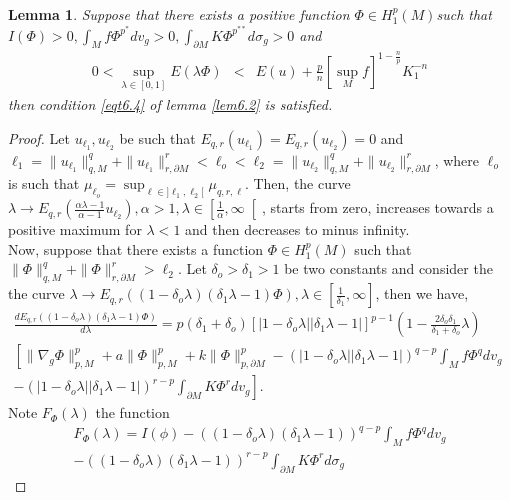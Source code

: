 \documentclass{Tran-l}
\newtheorem{lem}[thm]{Lemma}
\theoremstyle{definition}
\theoremstyle{remark}
\numberwithin{equation}{section}
\begin{document}
\begin{lem}\label{lem6.3}
Suppose that there exists a positive function $\Phi\in H^p_1(M)$such
that $I(\Phi)>0, \int_Mf\Phi^{p^*}dv_g>0, \int_{\partial
M}K\Phi^{p^{**}}d\sigma_g>0$ and
\begin{eqnarray*}
 0<\underset{\lambda\in[0,1]}\sup E(\lambda\Phi) &<&
E(u)+\frac{p}{n}\left[\sup_Mf\right]^{1-\frac{n}{p}}K_1^{-n}
\end{eqnarray*}
then  condition \eqref{eqt6.4} of lemma \ref{lem6.2} is satisfied.
\end{lem}
\begin{proof} Let  $u_{\ell_1},u_{\ell_2}$ be such that
$E_{q,r}(u_{\ell_1})=E_{q,r}(u_{\ell_2})=0$ and
$\ell_1=\|u_{\ell_1}\|^q_{q, M}+\|u_{\ell_1}\|^r_{r,\partial
M}<\ell_o<\ell_2=\|u_{\ell_2}\|^q_{q,
M}+\|u_{\ell_2}\|^r_{r,\partial M}$, where $\ell_o$ is such that
$\mu_{\ell_o}=\sup_{\ell\in]\ell_1,\ell_2[}\mu_{q,r,\ell}$. Then,
the curve $\lambda\rightarrow
E_{q,r}(\frac{\alpha\lambda-1}{\alpha-1} u_{\ell_2}), \alpha>1,
\lambda\in\left[\frac{1}{\alpha},\infty\right[$, starts from zero,
increases towards a positive maximum for $\lambda<1$ and
then decreases to minus infinity.\\
Now, suppose that there exists a function $\Phi\in H^p_1(M)$ such
that $\|\Phi\|^q_{q, M}+\|\Phi\|^r_{r,\partial M}>\ell_2$. Let
$\delta_o>\delta_1>1$ be two constants and consider the the curve
$\lambda\rightarrow E_{q,r}(
(1-\delta_o\lambda)(\delta_1\lambda-1)\Phi),
\lambda\in[\frac{1}{\delta_1},\infty]$, then we have,
\begin{eqnarray*}
\frac{dE_{q,r}((1-\delta_o\lambda)(\delta_1\lambda-1)\Phi)}{d\lambda}=
p(\delta_1+\delta_o)\left[|1-\delta_o\lambda||\delta_1\lambda-1|\right]^{p-1}
(1-\frac{2\delta_o\delta_1}{\delta_1+\delta_o}\lambda)\\
\left[\|\nabla_g\Phi\|^p_{p,M}+a\|\Phi\|^p_{p,M}+
k\|\Phi\|^p_{p,\partial
M}-\left(|1-\delta_o\lambda||\delta_1\lambda-1|\right)^{q-p}\int_Mf\Phi^qdv_g\right.\\
\left.-
\left(|1-\delta_o\lambda||\delta_1\lambda-1|\right)^{r-p}\int_{\partial
M}K\Phi^rdv_g\right].&
\end{eqnarray*}
Note $F_\Phi(\lambda)$ the function
\begin{eqnarray*}
F_\Phi(\lambda)=I(\phi)-
\left((1-\delta_o\lambda)(\delta_1\lambda-1)\right)^{q-p}\int_Mf\Phi^qdv_g\\
-\left((1-\delta_o\lambda)(\delta_1\lambda-1)\right)^{r-p}\int_{\partial
M}K\Phi^rd\sigma_g
\end{eqnarray*}

\end{proof}
\end{document}
